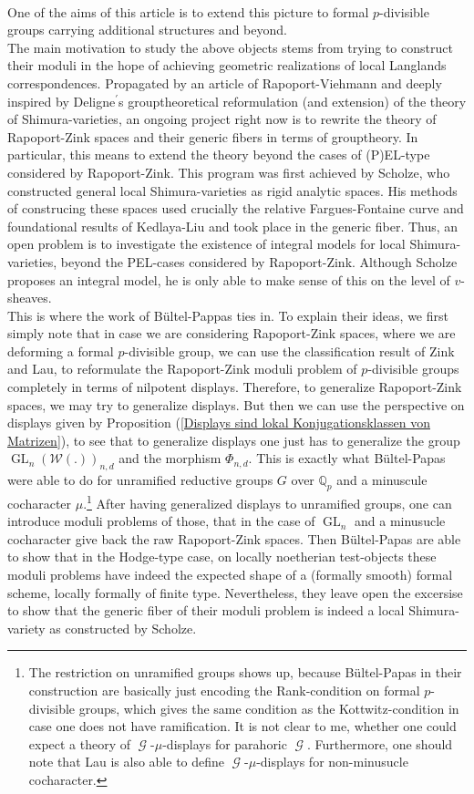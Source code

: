 \documentclass[a4paper,10,5 pt]{amsart}
\theoremstyle{definition}
\DeclareMathOperator{\GL}{GL}
\DeclareMathOperator{\G}{\mathcal{G}}
\begin{document}
\\
One of the aims of this article is to extend this picture to formal $p$-divisible groups carrying additional structures and beyond.
\\
The main motivation to study the above objects stems from trying to construct their moduli in the hope of achieving geometric realizations of local Langlands correspondences. Propagated by an article of Rapoport-Viehmann and deeply inspired by Deligne$^{\prime}$s grouptheoretical reformulation (and extension) of the theory of Shimura-varieties, an ongoing project right now is to rewrite the theory of Rapoport-Zink spaces and their generic fibers in terms of grouptheory. In particular, this means to extend the theory beyond the cases of (P)EL-type considered by Rapoport-Zink. This program was first achieved by Scholze, who constructed general local Shimura-varieties as rigid analytic spaces. His methods of construcing these spaces used crucially the relative Fargues-Fontaine curve and foundational results of Kedlaya-Liu and took place in the generic fiber. Thus, an open problem is to investigate the existence of integral models for local Shimura-varieties, beyond the PEL-cases considered by Rapoport-Zink. Although Scholze proposes an integral model, he is only able to make sense of this on the level of $v$-sheaves. 
\\
This is where the work of Bültel-Pappas \cite{BP} ties in. To explain their ideas, we first simply note that in case we are considering Rapoport-Zink spaces, where we are deforming a formal $p$-divisible group, we can use the classification result of Zink and Lau, to reformulate the Rapoport-Zink moduli problem of $p$-divisible groups completely in terms of nilpotent displays. Therefore, to generalize Rapoport-Zink spaces, we may try to generalize displays. But then we can use the perspective on displays given by Proposition (\ref{Displays sind lokal Konjugationsklassen von Matrizen}), to see that to generalize displays one just has to generalize the group $\GL_{n}(\mathcal{W}(.))_{n,d}$ and the morphism $\Phi_{n,d}.$ This is exactly what Bültel-Papas were able to do for unramified reductive groups $G$ over $\mathbb{Q}_{p}$ and a minuscule cocharacter $\mu.$\footnote{The restriction on unramified groups shows up, because Bültel-Papas in their construction are basically just encoding the Rank-condition on formal $p$-divisible groups, which gives the same condition as the Kottwitz-condition in case one does not have ramification. It is not clear to me, whether one could expect a theory of $\G$-$\mu$-displays for parahoric $\G.$ Furthermore, one should note that Lau is also able to define $\G$-$\mu$-displays for non-minusucle cocharacter.} After having generalized displays to unramified groups, one can introduce moduli problems of those, that in the case of $\GL_{n}$ and a minusucle cocharacter give back the raw Rapoport-Zink spaces. Then Bültel-Papas are able to show that in the Hodge-type case, on locally noetherian test-objects these moduli problems have indeed the expected shape of a (formally smooth) formal scheme, locally formally of finite type. Nevertheless, they leave open the excersise to show that the generic fiber of their moduli problem is indeed a local Shimura-variety as constructed by Scholze.
\end{document}
